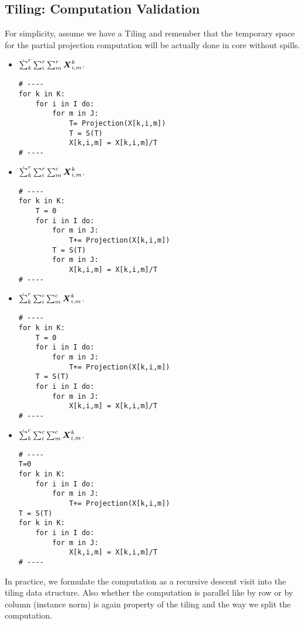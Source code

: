\documentclass[acmsmall]{acmart}
\begin{document}
\subsection{Tiling: Computation Validation}
For simplicity, assume we have a Tiling and remember that the
temporary space for the partial projection computation will be
actually done in core without spills.
\begin{itemize}
\item $\dot\sum_k^r\sum_{i}^r\sum_{m}^r{\boldsymbol X}^{k}_{i,m}$. 
\begin{verbatim}
# ----
for k in K: 
    for i in I do: 
        for m in J: 
            T= Projection(X[k,i,m]) 
            T = S(T)
            X[k,i,m] = X[k,i,m]/T
# ----
\end{verbatim} 
\item $\dot\sum_k^r\sum_{i}^r\sum_{m}^c{\boldsymbol X}^{k}_{i,m}$. 
\begin{verbatim}
# ----
for k in K: 
    T = 0
    for i in I do: 
        for m in J: 
            T+= Projection(X[k,i,m]) 
        T = S(T)
        for m in J: 
            X[k,i,m] = X[k,i,m]/T
# ----
\end{verbatim} 
\item $\dot\sum_k^r\sum_{i}^c\sum_{m}^c{\boldsymbol X}^{k}_{i,m}$. 
\begin{verbatim}
# ----
for k in K: 
    T = 0
    for i in I do: 
        for m in J: 
            T+= Projection(X[k,i,m]) 
    T = S(T)
    for i in I do: 
        for m in J: 
            X[k,i,m] = X[k,i,m]/T
# ----
\end{verbatim} 
\item $\dot\sum_k^c\sum_{i}^c\sum_{m}^c{\boldsymbol X}^{k}_{i,m}$. 
\begin{verbatim}
# ----
T=0
for k in K: 
    for i in I do: 
        for m in J: 
            T+= Projection(X[k,i,m]) 
T = S(T)
for k in K: 
    for i in I do: 
        for m in J: 
            X[k,i,m] = X[k,i,m]/T
# ----
\end{verbatim}
\end{itemize}

In practice, we formulate the computation as a recursive descent visit
into the tiling data structure. Also whether the computation is
parallel like by row or by column (instance norm) is again property of
the tiling and the way we split the computation.
\end{document}
